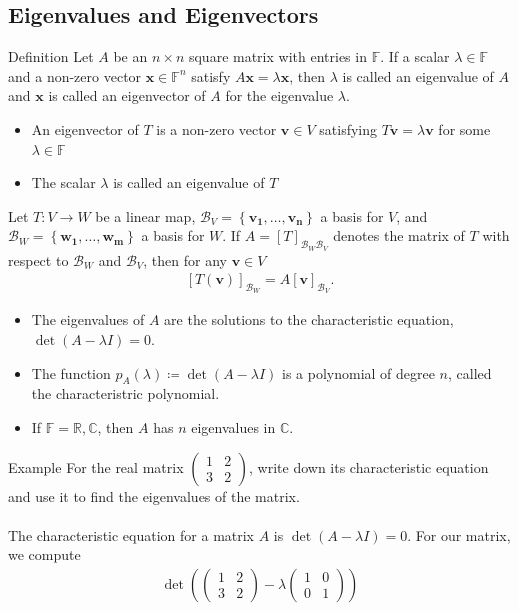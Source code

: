 \documentclass{report}
\renewcommand{\vec}{\mathbf}
\newcommand{\Det}{\operatorname{det}}
\newcommand{\cvec}[1]{ \begin{pmatrix} #1 \end{pmatrix} }
\begin{document}
\begin{enumerate}
\chapter{Eigenvalues and Eigenvectors}

	\begin{question}{Definition}
		Let $A$ be an $n \times n$ square matrix with entries in $\mathbb{F}$. If a scalar $\lambda \in \mathbb{F}$ and a non-zero vector $\vec{x} \in \mathbb{F}^n$ satisfy $A \vec{x} = \lambda \vec{x}$, then $\lambda$ is called an eigenvalue of $A$ and $\vec{x}$ is called an eigenvector of $A$ for the eigenvalue $\lambda$.
	\end{question}

	\begin{itemize}
		\item An eigenvector of $T$ is a non-zero vector $\vec{v} \in V$ satisfying $T\vec{v} = \lambda \vec{v}$ for some $\lambda \in \mathbb{F}$
		\item The scalar $\lambda$ is called an eigenvalue of $T$
	\end{itemize}

	Let $T:V \to W$ be a linear map, $\mathcal{B}_V = \left\{\vec{v_1}, \dots, \vec{v_n}\right\}$  a basis for $V$, and $\mathcal{B}_W = \left\{\vec{w_1},\dots,\vec{w_m}\right\}$ a basis for $W$. If $A = [T]_{\mathcal{B}_W\mathcal{B}_V}$ denotes the matrix of $T$ with respect to $\mathcal{B}_W$ and $\mathcal{B}_V$, then for any $\vec{v} \in V$
	\begin{align*}
		\left[T(\vec{v})\right]_{\mathcal{B}_W} = A[\vec{v}]_{\mathcal{B}_V}.
	\end{align*}

	\begin{itemize}
		\item The eigenvalues of $A$ are the solutions to the characteristic equation, $\Det(A-\lambda I) = 0$.
		\item The function $p_A(\lambda) \coloneq \Det(A - \lambda I)$ is a polynomial of degree $n$, called the characteristric polynomial.
		\item If $\mathbb{F} = \mathbb{R}, \mathbb{C}$, then $A$ has $n$ eigenvalues in $\mathbb{C}$.
	\end{itemize}

	\begin{question}{Example}
		For the real matrix $\cvec{1&2\\3&2}$, write down its characteristic equation and use it to find the eigenvalues of the matrix.
		\\ \\
		The characteristic equation for a matrix $A$ is $\Det(A - \lambda I) = 0$. For our matrix, we compute
		\begin{align*}
			\Det\left( \cvec{1&2\\3&2} - \lambda \cvec{1&0\\0&1} \right) %
		\end{align*}
	\end{question}


\end{enumerate}
\end{document}
